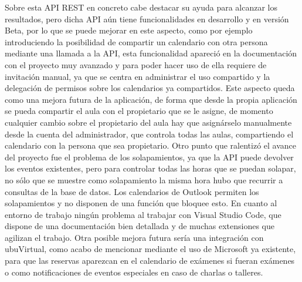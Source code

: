 Sobre esta API REST en concreto cabe destacar su ayuda para alcanzar los resultados, pero dicha API aún tiene funcionalidades en desarrollo y en versión Beta, por lo que se puede mejorar en este aspecto, como por ejemplo introduciendo la posibilidad de compartir un calendario con otra persona mediante una llamada a la API, esta funcionalidad apareció en la documentación con el proyecto muy avanzado y para poder hacer uso de ella requiere de invitación manual, ya que se centra en administrar el uso compartido y la delegación de permisos sobre los calendarios ya compartidos. Este aspecto queda como una mejora futura de la aplicación, de forma que desde la propia aplicación se pueda compartir el aula con el propietario que se le asigne, de momento cualquier cambio sobre el propietario del aula hay que asignárselo manualmente desde la cuenta del administrador, que controla todas las aulas, compartiendo el calendario con la persona que sea propietario.\newline
Otro punto que ralentizó el avance del proyecto fue el problema de los solapamientos, ya que la API puede devolver los eventos existentes, pero para controlar todas las horas que se puedan solapar, no sólo que se muestre como solapamiento la misma hora hubo que recurrir a consultas de la base de datos. Los calendarios de Outlook permiten los solapamientos y no disponen de una función que bloquee esto.\newline
En cuanto al entorno de trabajo ningún problema al trabajar con Visual Studio Code, que dispone de una documentación bien detallada y de muchas extensiones que agilizan el trabajo.\newline
Otra posible mejora futura sería una integración con ubuVirtual, como acabo de mencionar mediante el uso de Microsoft ya existente, para que las reservas aparezcan en el calendario de exámenes si fueran exámenes o como notificaciones de eventos especiales en caso de charlas o talleres.\newline 



